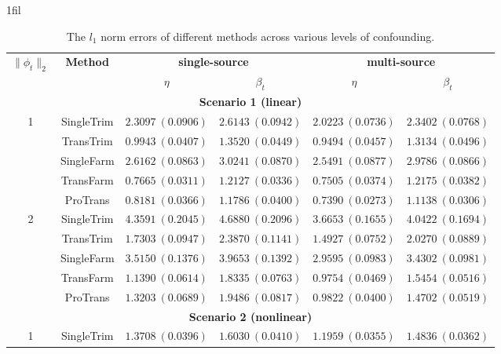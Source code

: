 \documentclass[12pt]{article}
\makeatletter
\newcommand*{\centerfloat}{%
  \parindent \z@
  \leftskip \z@ \@plus 1fil \@minus \marginparwidth
  \rightskip \leftskip
  \parfillskip \z@skip}
\makeatother
\begin{document}
\begin{table}[!ht]
\renewcommand{\arraystretch}{0.6}
\footnotesize
\centerfloat
\caption{The $l_1$ norm errors of different methods across various levels of confounding.}
\label{table:l1_confounding}
\begin{tabular}{cccccc}
        \toprule
        \multirow{2}{*}{\textbf{$\|\phi_t\|_2$}} & \multirow{2}{*}{\textbf{Method}} & \multicolumn{2}{c}{\textbf{single-source}} & \multicolumn{2}{c}{\textbf{multi-source}}\\
        \cmidrule(lr){3-4} \cmidrule(lr){5-6} 
        & & $\eta$ & $\beta_{t}$ & $\eta$& $\beta_{t}$ \\
        \midrule
        \multicolumn{6}{c}{\textbf{Scenario 1 (linear)}}\\
        \hline
       \multirow{5}{*}{1}
& SingleTrim  & $2.3097\ (0.0906)$ & $2.6143\ (0.0942)$ & $2.0223\ (0.0736)$ & $2.3402\ (0.0768)$ \\
& TransTrim   & $0.9943\ (0.0407)$ & $1.3520\ (0.0449)$ & $0.9494\ (0.0457)$ & $1.3134\ (0.0496)$ \\
& SingleFarm  & $2.6162\ (0.0863)$ & $3.0241\ (0.0870)$ & $2.5491\ (0.0877)$ & $2.9786\ (0.0866)$ \\
& TransFarm   & $\bm{0.7665}\ (0.0311)$ & $1.2127\ (0.0336)$ & $0.7505\ (0.0374)$ & $1.2175\ (0.0382)$ \\
& ProTrans    & $0.8181\ (0.0366)$ & $\bm{1.1786}\ (0.0400)$ & $\bm{0.7390}\ (0.0273)$ & $\bm{1.1138}\ (0.0306)$ \\
\hline
\multirow{5}{*}{2}
& SingleTrim  & $4.3591\ (0.2045)$ & $4.6880\ (0.2096)$ & $3.6653\ (0.1655)$ & $4.0422\ (0.1694)$ \\
& TransTrim   & $1.7303\ (0.0947)$ & $2.3870\ (0.1141)$ & $1.4927\ (0.0752)$ & $2.0270\ (0.0889)$ \\
& SingleFarm  & $3.5150\ (0.1376)$ & $3.9653\ (0.1392)$ & $2.9595\ (0.0983)$ & $3.4302\ (0.0981)$ \\
& TransFarm   & $\bm{1.1390}\ (0.0614)$ & $\bm{1.8335}\ (0.0763)$ & $\bm{0.9754}\ (0.0469)$ & $1.5454\ (0.0516)$ \\
& ProTrans    & $1.3203\ (0.0689)$ & $1.9486\ (0.0817)$ & $0.9822\ (0.0400)$ & $\bm{1.4702}\ (0.0519)$ \\
        \hline
         \multicolumn{6}{c}{\textbf{Scenario 2 (nonlinear)}}\\
         \hline
        \multirow{5}{*}{1}
& SingleTrim  & $1.3708\ (0.0396)$ & $1.6030\ (0.0410)$ & $1.1959\ (0.0355)$ & $1.4836\ (0.0362)$ \\

\end{tabular}
\end{table}
\end{document}
